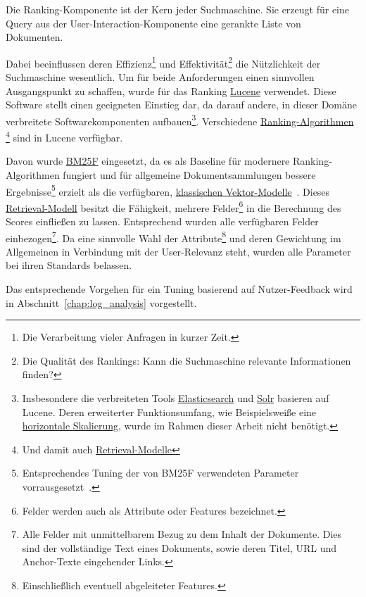 Die Ranking-Komponente ist der Kern jeder Suchmaschine.
Sie erzeugt für eine Query aus der User-Interaction-Komponente eine gerankte Liste von Dokumenten.

Dabei beeinflussen deren Effizienz\footnote{Die Verarbeitung vieler Anfragen in kurzer Zeit.}
und Effektivität\footnote{Die Qualität des Rankings: Kann die Suchmaschine relevante Informationen finden?}
die Nützlichkeit der Suchmaschine wesentlich.
Um für beide Anforderungen einen sinnvollen Ausgangspunkt zu schaffen, wurde für das Ranking
\href{https://lucene.apache.org/}{Lucene} verwendet.
Diese Software stellt einen geeigneten Einstieg dar, da darauf andere,
in dieser Domäne verbreitete Softwarekomponenten aufbauen\footnote{Insbesondere die verbreiteten Tools\cite{}
\href{https://de.wikipedia.org/wiki/Elasticsearch}{Elasticsearch} und \href{http://lucene.apache.org/solr/}{Solr}
basieren auf Lucene. Deren erweiterter Funktionsumfang, wie Beispielsweiße eine
\href{http://www.searchdatacenter.de/definition/Horizontale-Skalierung-Scale-out}{horizontale Skalierung}, wurde im Rahmen dieser Arbeit nicht benötigt.}.
Verschiedene \href{https://en.wikipedia.org/wiki/Ranking_(information_retrieval)}{Ranking-Algorithmen}
\footnote{Und damit auch 
\href{https://de.wikipedia.org/wiki/Information_Retrieval\#Retrievalmodelle}{Retrieval-Modelle}}
sind in Lucene verfügbar.

Davon wurde \href{https://en.wikipedia.org/wiki/Okapi_BM25}{BM25F} eingesetzt,
da es als Baseline für modernere Ranking-Algorithmen fungiert und für allgemeine
Dokumentsammlungen bessere Ergebnisse\footnote{Entsprechendes Tuning der von BM25F verwendeten Parameter vorrausgesetzt~\cite{baeza_yates.107}.}
erzielt als die verfügbaren,
\href{https://opensourceconnections.com/blog/2015/10/16/bm25-the-next-generation-of-lucene-relevation/}{klassischen Vektor-Modelle}~\cite{baeza_yates.107}.
Dieses \href{https://de.wikipedia.org/wiki/Information_Retrieval#Retrievalmodelle}{Retrieval-Modell}
besitzt die Fähigkeit, mehrere Felder\footnote{Felder werden auch als Attribute oder Features bezeichnet.} in die Berechnung des Scores einfließen zu lassen.
Entsprechend wurden alle verfügbaren Felder 
einbezogen\footnote{Alle Felder mit unmittelbarem Bezug zu dem Inhalt der Dokumente.
Dies sind der vollständige Text eines Dokuments, sowie deren Titel, URL und Anchor-Texte eingehender Links.}.
Da eine sinnvolle Wahl der Attribute\footnote{Einschließlich eventuell abgeleiteter Features.}
und deren Gewichtung im Allgemeinen in
Verbindung mit der User-Relevanz steht, wurden alle Parameter bei ihren Standards belassen.

Das entsprechende Vorgehen für ein Tuning basierend auf Nutzer-Feedback
wird in Abschnitt~\ref{chap:log_analysis} vorgestellt.
